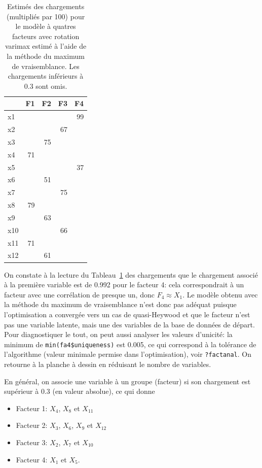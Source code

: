 \documentclass[
  11pt,
  letterpaper,
]{scrbook}
\providecommand{\tightlist}{%
  \setlength{\itemsep}{0pt}\setlength{\parskip}{0pt}}\usepackage{longtable,booktabs,array}
\theoremstyle{definition}
\theoremstyle{remark}
\begin{document}
\begin{longtable}[t]{lrrrr}

\caption{\label{tbl-factanal4}Estimés des chargements (multipliés par
100) pour le modèle à quatres facteurs avec rotation varimax estimé à
l'aide de la méthode du maximum de vraisemblance. Les chargements
inférieurs à 0.3 sont omis.}

\tabularnewline

\toprule
 & F1 & F2 & F3 & F4\\
\midrule
x1 &  &  &  & 99\\
x2 &  &  & 67 & \\
x3 &  & 75 &  & \\
x4 & 71 &  &  & \\
x5 &  &  &  & 37\\
\addlinespace
x6 &  & 51 &  & \\
x7 &  &  & 75 & \\
x8 & 79 &  &  & \\
x9 &  & 63 &  & \\
x10 &  &  & 66 & \\
\addlinespace
x11 & 71 &  &  & \\
x12 &  & 61 &  & \\
\bottomrule

\end{longtable}

On constate à la lecture du Tableau~\ref{tbl-factanal4} des chargements
que le chargement associé à la première variable est de 0.992 pour le
facteur 4: cela correspondrait à un facteur avec une corrélation de
presque un, donc \(F_4 \approx X_1\). Le modèle obtenu avec la méthode
du maximum de vraisemblance n'est donc pas adéquat puisque
l'optimisation a convergée vers un cas de quasi-Heywood et que le
facteur n'est pas une variable latente, mais une des variables de la
base de données de départ. Pour diagnostiquer le tout, on peut aussi
analyser les valeurs d'unicité: la minimum de
\texttt{min(fa4\$uniqueness)} est 0.005, ce qui correspond à la
tolérance de l'algorithme (valeur minimale permise dans l'optimisation),
voir \texttt{?factanal}. On retourne à la planche à dessin en réduisant
le nombre de variables.

En général, on associe une variable à un groupe (facteur) si son
chargement est supérieur à 0.3 (en valeur absolue), ce qui donne

\begin{itemize}
\tightlist
\item
  Facteur 1: \(X_4\), \(X_8\) et \(X_{11}\)
\item
  Facteur 2: \(X_3\), \(X_6\), \(X_9\) et \(X_{12}\)
\item
  Facteur 3: \(X_2\), \(X_7\) et \(X_{10}\)
\item
  Facteur 4: \(X_1\) et \(X_5\).
\end{itemize}
\end{document}
